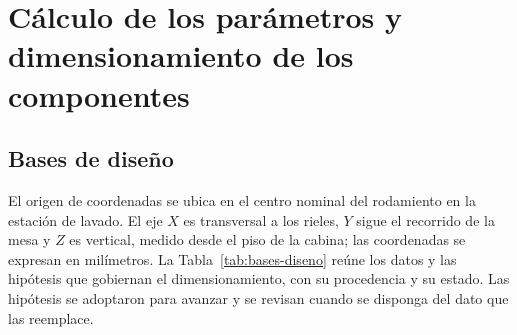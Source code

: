 \section{Cálculo de los parámetros y dimensionamiento de los componentes}

\subsection{Bases de diseño}
\label{sec:bases-diseno}

El origen de coordenadas se ubica en el centro nominal del rodamiento en la estación de lavado. El eje $X$ es transversal a los rieles, $Y$ sigue el recorrido de la mesa y $Z$ es vertical, medido desde el piso de la cabina; las coordenadas se expresan en milímetros. La Tabla~\ref{tab:bases-diseno} reúne los datos y las hipótesis que gobiernan el dimensionamiento, con su procedencia y su estado. Las hipótesis se adoptaron para avanzar y se revisan cuando se disponga del dato que las reemplace.

